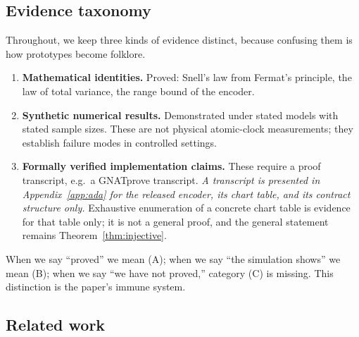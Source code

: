 \documentclass[11pt]{article}
\begin{document}
\subsection{Evidence taxonomy}\label{sec:taxonomy}

Throughout, we keep three kinds of evidence distinct, because confusing them is how
prototypes become folklore.
\begin{enumerate}[label=(\Alph*)]
\item \textbf{Mathematical identities.} Proved: Snell's law from Fermat's principle,
the law of total variance, the range bound of the encoder.
\item \textbf{Synthetic numerical results.} Demonstrated under stated models with
stated sample sizes. These are not physical atomic-clock measurements; they establish
failure modes in controlled settings.
\item \textbf{Formally verified implementation claims.} These require a proof
transcript, e.g.\ a GNATprove transcript. \emph{A transcript is presented in
Appendix~\ref{app:ada} for the released encoder, its chart table, and its contract
structure only.} Exhaustive enumeration of a concrete chart table is evidence for that
table only; it is not a general proof, and the general statement remains
Theorem~\ref{thm:injective}.
\end{enumerate}
When we say ``proved'' we mean (A); when we say ``the simulation shows'' we mean (B);
when we say ``we have not proved,'' category (C) is missing. This distinction is the
paper's immune system.

\subsection{Related work}\label{sec:related}
\end{document}
